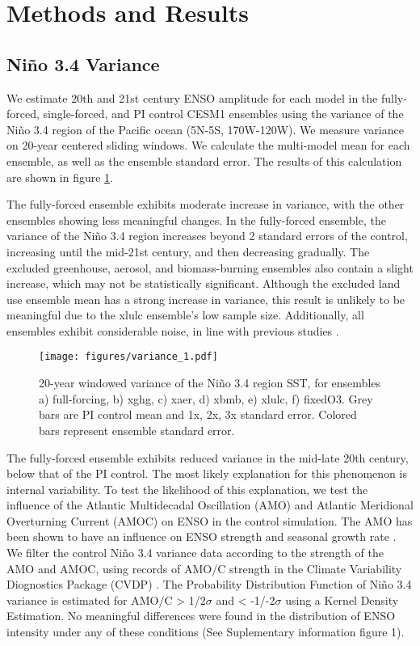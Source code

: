\documentclass[draft]{agujournal2019}
\begin{document}
\section{Methods and Results}

\subsection{Ni\~{n}o 3.4 Variance}
We estimate 20th and 21st century ENSO amplitude for each model in the fully-forced, single-forced, and PI control CESM1 ensembles using the variance of the Ni\~{n}o 3.4 region of the Pacific ocean (5N-5S, 170W-120W). We measure variance on 20-year centered sliding windows. We calculate the multi-model mean for each ensemble, as well as the ensemble standard error. The results of this calculation are shown in figure \ref{fig:variance_1}.

The fully-forced ensemble exhibits moderate increase in variance, with the other ensembles showing less meaningful changes. In the fully-forced ensemble, the variance of the Ni\~{n}o 3.4 region increases beyond 2 standard errors of the control, increasing until the mid-21st century, and then decreasing gradually. The excluded greenhouse, aerosol, and biomass-burning ensembles also contain a slight increase, which may not be statistically significant. Although the excluded land use ensemble mean has a strong increase in variance, this result is unlikely to be meaningful due to the xlulc ensemble's low sample size. Additionally, all ensembles exhibit considerable noise, in line with previous studies \cite{maher2018enso}. 

\begin{figure}
    \texttt{[image: figures/variance\_1.pdf]}
    \caption{20-year windowed variance of the Ni\~{n}o 3.4 region SST, for ensembles a) full-forcing, b) xghg, c) xaer, d) xbmb, e) xlulc, f) fixedO3. Grey bars are PI control mean and 1x, 2x, 3x standard error. Colored bars represent ensemble standard error.}
    \label{fig:variance_1}
\end{figure}

The fully-forced ensemble exhibits reduced variance in the mid-late 20th century, below that of the PI control. The most likely explanation for this phenomenon is internal variability. To test the likelihood of this explanation, we test the influence of the Atlantic Multidecadal Oscillation (AMO) and Atlantic Meridional Overturning Current (AMOC) on ENSO in the control simulation. The AMO has been shown to have an influence on ENSO strength and seasonal growth rate \cite{levine2017impact}. We filter the control Ni\~{n}o 3.4 variance data according to the strength of the AMO and AMOC, using records of AMO/C strength in the Climate Variability Diognostics Package (CVDP) \cite{phillips2014evaluating}. The Probability Distribution Function of Ni\~{n}o 3.4 variance is estimated for AMO/C > 1/2$\sigma$ and < -1/-2$\sigma$ using a Kernel Density Estimation. No meaningful differences were found in the distribution of ENSO intensity under any of these conditions (See Suplementary information figure 1).
\end{document}

